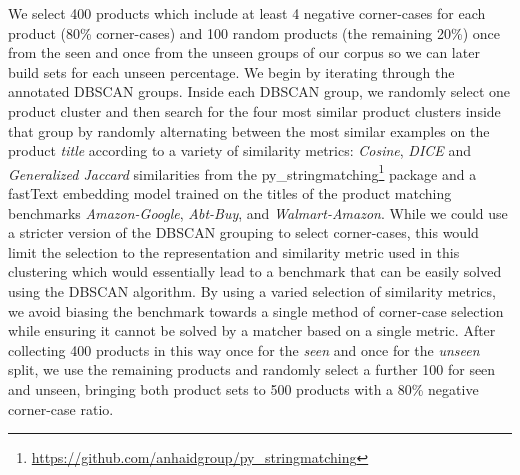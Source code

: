 \documentclass[sigconf,edbt]{acmart-edbt2024}
\begin{document}
We select 400 products which include at least 4 negative corner-cases for each product (80\% corner-cases) and 100 random products (the remaining 20\%) once from the seen and once from the unseen groups of our corpus so we can later build sets for each unseen percentage. We begin by iterating through the annotated DBSCAN groups. Inside each DBSCAN group, we randomly select one product cluster and then search for the four most similar product clusters inside that group by randomly alternating between the most similar examples on the product \textit{title} according to a variety of similarity metrics: \textit{Cosine}, \textit{DICE} and \textit{Generalized Jaccard} similarities from the py\_stringmatching\footnote{\url{https://github.com/anhaidgroup/py\_stringmatching}} package and a fastText embedding model trained on the titles of the product matching benchmarks \textit{Amazon-Google}, \textit{Abt-Buy}, and \textit{Walmart-Amazon}. While we could use a stricter version of the DBSCAN grouping to select corner-cases, this would limit the selection to the representation and similarity metric used in this clustering which would essentially lead to a benchmark that can be easily solved using the DBSCAN algorithm. By using a varied selection of similarity metrics, we avoid biasing the benchmark towards a single method of corner-case selection while ensuring it cannot be solved by a matcher based on a single metric. After collecting 400 products in this way once for the \textit{seen} and once for the \textit{unseen} split, we use the remaining products and randomly select a further 100 for seen and unseen, bringing both product sets to 500 products with a 80\% negative corner-case ratio.
\end{document}
